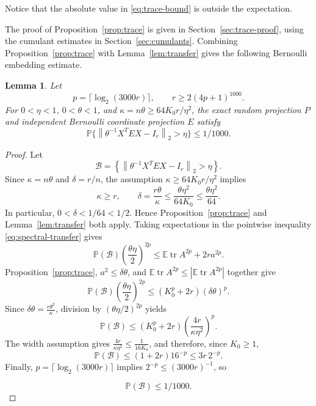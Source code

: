 \documentclass[11pt]{article}
\newtheorem{lemma}[theorem]{Lemma}
\theoremstyle{definition}
\theoremstyle{remark}
\theoremstyle{plain}
\newcommand{\E}{\mathbb E}
\newcommand{\Prob}{\mathbb P}
\DeclareMathOperator{\tr}{tr}
\newcommand{\norm}[1]{\left\lVert#1\right\rVert_2}
\begin{document}
Notice that the absolute value in \eqref{eq:trace-bound} is outside the expectation.

The proof of Proposition~\ref{prop:trace} is given in
Section~\ref{sec:trace-proof}, using the cumulant estimates in
Section~\ref{sec:cumulants}. Combining Proposition~\ref{prop:trace}
with Lemma~\ref{lem:transfer} gives the following Bernoulli
embedding estimate.


\begin{samepage}
\begin{lemma}\label{cor:bernoulli}
Let
\[
 p=\lceil\log_2(3000r)\rceil,
 \qquad
 r\ge2(4p+1)^{1000}.
\]
For \(0<\eta<1\), \(0<\theta<1\), and
\(\kappa=n\theta\ge64K_0r/\eta^2\), the exact random projection \(P\)
and independent Bernoulli coordinate projection \(E\) satisfy
\begin{equation}\label{eq:bernoulli-bound}
 \Prob\{\norm{\theta^{-1}X^TEX-I_r}>\eta\}\le1/1000.
\end{equation}
\end{lemma}
\end{samepage}
\begin{proof}
Let
$$
 \mathcal B
   =\left\{
      \norm{\theta^{-1}X^TEX-I_r}>\eta
     \right\}.
$$
Since \(\kappa=n\theta\) and \(\delta=r/n\), the assumption
\(\kappa\ge64K_0r/\eta^2\) implies
$$
 \kappa\ge r,
 \qquad
 \delta=\frac{r\theta}{\kappa}
     \le \frac{\theta\eta^2}{64K_0}
     \le \frac{\theta\eta^2}{64}.
$$
In particular, $0<\delta<1/64<1/2$. Hence Proposition~\ref{prop:trace} and
Lemma~\ref{lem:transfer} both apply. 
Taking expectations in the pointwise inequality
\eqref{eq:spectral-transfer} gives
$$
 \Prob(\mathcal B)\left(\frac{\theta\eta}{2}\right)^{2p}
 \le
 \E\tr A^{2p}+2r a^{2p}.
$$
Proposition~\ref{prop:trace},
\(a^2\le\delta\theta\), and
\(\E\tr A^{2p}\le|\E\tr A^{2p}|\) together give
$$
 \Prob(\mathcal B)\left(\frac{\theta\eta}{2}\right)^{2p}
 \le
 (K_0^p+2r)(\delta\theta)^p.
$$
Since
$
 \delta\theta=\frac{r\theta^2}{\kappa}
$, 
division by \((\theta\eta/2)^{2p}\) yields
$$
 \Prob(\mathcal B)
 \le
 (K_0^p+2r)
 \left(\frac{4r}{\kappa\eta^2}\right)^p.
$$
The width assumption gives
$
 \frac{4r}{\kappa\eta^2}\le\frac1{16K_0}
$, 
and therefore, since \(K_0\ge1\),
$$
 \Prob(\mathcal B)
 \le
 (1+2r)16^{-p}
 \le
 3r\,2^{-p}.
$$
Finally,
\(p=\lceil\log_2(3000r)\rceil\) implies
\(2^{-p}\le(3000r)^{-1}\), so

$$
 \Prob(\mathcal B)\le 1/{1000}.
$$

\end{proof}
\end{document}
